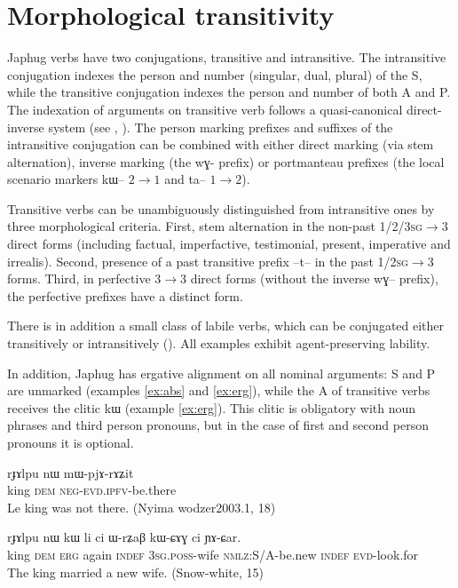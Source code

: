 \documentclass[oldfontcommands,oneside,a4paper,11pt]{article}
\newcommand{\ipa}[1]{{\phon \mbox{#1}}} %
\begin{document}
\section{Morphological transitivity}

Japhug verbs have two conjugations, transitive and intransitive. The intransitive conjugation indexes the person and number (singular, dual, plural) of the S, while the transitive conjugation indexes the person and number of both A and P. The indexation of arguments on transitive verb follows a quasi-canonical direct-inverse system (see \citealt{jacques10inverse}, \citealt{jacques14inverse}). The person marking prefixes and suffixes of the intransitive conjugation can be combined with either direct marking (via stem alternation), inverse marking (the \ipa{wɣ-} prefix) or portmanteau prefixes (the local scenario markers \ipa{kɯ--} $2\rightarrow1$ and \ipa{ta--} $1\rightarrow2$).

Transitive verbs can be unambiguously distinguished from intransitive ones by three morphological criteria. First, stem alternation in the non-past  \textsc{1/2/3sg}$\rightarrow$3 direct forms (including factual, imperfactive, testimonial, present, imperative and irrealis). Second, presence of a past transitive prefix \ipa{--t--} in the past \textsc{1/2sg}$\rightarrow$3 forms. Third, in perfective 3$\rightarrow$3 direct forms (without the inverse \ipa{wɣ--} prefix), the perfective prefixes have a distinct form.

There is in addition a small class of labile verbs, which can be conjugated either transitively or intransitively (\citealt{jacques12demotion}). All examples exhibit agent-preserving  lability.

In addition, Japhug has ergative alignment on all nominal arguments:  S and P are unmarked (examples \ref{ex:abs} and \ref{ex:erg}), while the A of transitive verbs receives the clitic \ipa{kɯ} (example \ref{ex:erg}). This clitic is obligatory with noun phrases and third person pronouns, but in the case of first and second person pronouns it is optional.  

 \begin{exe}
\ex \label{ex:abs}
\gll
\ipa{rɟɤlpu}  	\ipa{nɯ}  	\ipa{mɯ-pjɤ-rɤʑit}  \\
king \textsc{dem} \textsc{neg-evd.ipfv}-be.there \\
 \glt Le king was not there. (Nyima wodzer2003.1, 18)
\end{exe}

 \begin{exe}
\ex \label{ex:erg}
\gll 
\ipa{rɟɤlpu}  	\ipa{nɯ}  	\ipa{kɯ}  	\ipa{li}  	\ipa{ci}  	\ipa{ɯ-rʑaβ}  	\ipa{kɯ-ɕɤɣ}  	\ipa{ci}  	\ipa{ɲɤ-ɕar.}  	 \\
king \textsc{dem} \textsc{erg} again \textsc{indef} \textsc{3sg.poss}-wife \textsc{nmlz}:S/A-be.new \textsc{indef}  \textsc{evd}-look.for \\
\glt The king married a new wife. (Snow-white, 15)
\end{exe}
\end{document}
